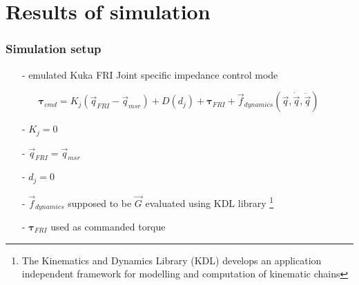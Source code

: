 \section{Results of simulation}
\begin{frame}
  \frametitle{Simulation setup}
  \begin{itemize}
  \item[-] \alert{emulated} Kuka FRI Joint specific impedance control mode
    \begin{itemize}
    \item[] $\boldsymbol{\tau}_{cmd} = K_j(\vec{q}_{FRI} - \vec{q}_{msr}) + D(d_{j}) + \boldsymbol{\tau}_{FRI} + \vec{f}_{dynamics}(\vec{q}, \dot{\vec{q}}, \ddot{\vec{q}})$
    \end{itemize}
  \item[-] $K_j = 0$
  \item[-] $\vec{q}_{FRI} = \vec{q}_{msr}$
  \item[-] $d_{j} = 0$
  \item[-] $\vec{f}_{dynamics}$ supposed to be $\vec{G}$ evaluated using KDL library
    \footnote[frame]{The Kinematics and Dynamics Library (KDL) develops an application independent framework for modelling and computation of kinematic chains}
  \item[-] $\boldsymbol{\tau}_{FRI}$ used as commanded torque
  \end{itemize}
\end{frame}

